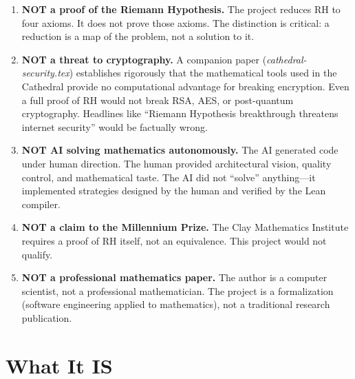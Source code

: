 \documentclass[11pt,a4paper]{article}
\begin{document}
\begin{enumerate}
  \item \textcolor{wrong}{\textbf{NOT a proof of the Riemann
    Hypothesis.}} The project reduces RH to four axioms. It does
    not prove those axioms. The distinction is critical: a
    reduction is a map of the problem, not a solution to it.

  \item \textcolor{wrong}{\textbf{NOT a threat to cryptography.}}
    A companion paper (\emph{cathedral-security.tex}) establishes
    rigorously that the mathematical tools used in the Cathedral
    provide no computational advantage for breaking encryption.
    Even a full proof of RH would not break RSA, AES, or
    post-quantum cryptography. Headlines like ``Riemann Hypothesis
    breakthrough threatens internet security'' would be factually
    wrong.

  \item \textcolor{wrong}{\textbf{NOT AI solving mathematics
    autonomously.}} The AI generated code under human direction.
    The human provided architectural vision, quality control, and
    mathematical taste. The AI did not ``solve'' anything---it
    implemented strategies designed by the human and verified by
    the Lean compiler.

  \item \textcolor{wrong}{\textbf{NOT a claim to the Millennium
    Prize.}} The Clay Mathematics Institute requires a proof of
    RH itself, not an equivalence. This project would not qualify.

  \item \textcolor{wrong}{\textbf{NOT a professional mathematics
    paper.}} The author is a computer scientist, not a
    professional mathematician. The project is a formalization
    (software engineering applied to mathematics), not a
    traditional research publication.
\end{enumerate}

\section{What It IS}
\end{document}
